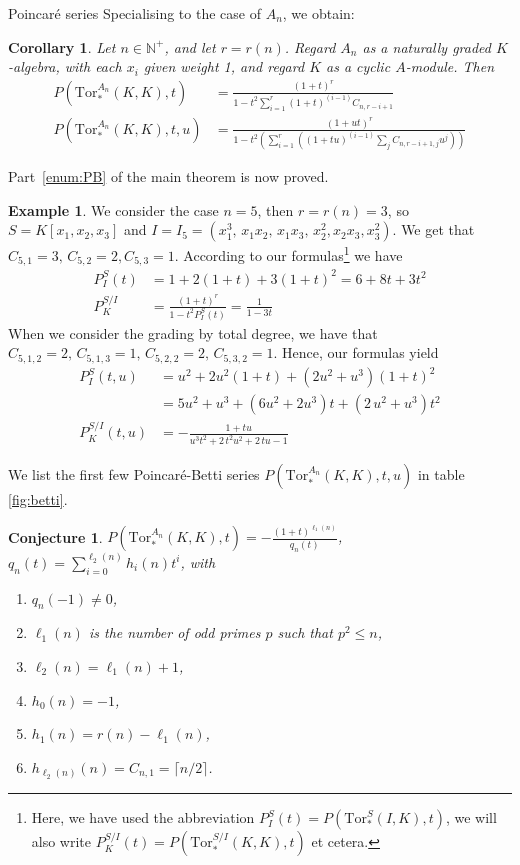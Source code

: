 \documentclass[reqno,10pt]{amsart}
\newcommand{\Tor}{\mathrm{Tor}}
\theoremstyle{definition}
\newtheorem{example}[definition]{Example}
\theoremstyle{remark}
\theoremstyle{plain}
\newtheorem{corr}[definition]{Corollary}
\newtheorem{conjecture}[definition]{Conjecture}
\newcommand{\Nat}{{\mathbb{N}}}
\begin{document}
\begin{section}{Poincar{\'e} series}
Specialising to the case of \(A_n\), we obtain:
\begin{corr}
  \label{corr:pb}
  Let \(n \in \Nat^+\), and let \(r=r(n)\). Regard \(A_n\) as a
  naturally graded \(K\)-algebra, with 
  each \(x_i\) given weight 1, and regard \(K\) as a cyclic \(A\)-module. Then 
  \begin{align}
    P(\Tor_{*}^{A_n}(K,K),t) &= 
    \frac{(1+t)^r}{1- t^2 \sum_{i=1}^r (1+t)^{(i-1)} C_{n,r-i+1} }  \\
    P(\Tor_{*}^{A_n}(K,K),t,u) &= 
    \frac{(1+ut)^r}{1- t^2 \left(\sum_{i=1}^r \left((1+tu)^{(i-1)}
    \sum_j C_{n,r-i+1,j} u^{j}\right)\right)} 
  \end{align}
\end{corr}
Part~\ref{enum:PB}   of the main theorem is now proved.

\begin{example}
  We consider the case \(n=5\), then \(r=r(n)=3\), so
  \(S=K[x_1,x_2,x_3]\) and \(I=I_5 = (x_1^3,\, x_1x_2,\,
  x_1x_3,\, x_2^2, x_2x_3, x_3^2)\). We get that \(C_{5,1}=3,\, C_{5,2}=2,
  C_{5,3}=1\). According to our formulas\footnote{Here, we have used
    the abbreviation  \(P_I^S(t) = P(\Tor_{*}^{S}(I,K),t)\), we will
    also write \(P_K^{S/I}(t) = P(\Tor_{*}^{S/I}(K,K),t)\) et cetera.}
  we  have
  \begin{align*}
  P_I^S(t) &= 1 + 2(1+t) + 3(1+t)^2 =  6  + 8t + 3t^2 \\
  P_K^{S/I} &= \frac{(1+t)^r}{1-t^2 P_I^S(t)} = \frac{1}{1-3t} 
  \end{align*}
  When we consider the grading by total degree, 
  we have that \(C_{5,1,2}=2, \, C_{5,1,3}=1, \, C_{5,2,2} = 2, \,
  C_{5,3,2}=1\). Hence, our formulas yield
  \begin{align*}
    P_I^S(t,u) &= u^2 + 2u^2(1+t) + (2u^2+u^3)(1+t)^2 \\&=
    5{u}^{2}+{u}^{3} + (6{u}^{2}+2{u}^{3})t + \left
      (2\,{u}^{2}+{u}^{3}\right ){t}^{2} \\
    P_K^{S/I}(t,u) &= -{\frac {1+tu}{{u}^{3}{t}^{2}+2\,{t}^{2}{u}^{2}+2\,tu-1}}
  \end{align*}
\end{example}

We list the first few Poincar{\'e}-Betti series
\(P(\Tor_{*}^{A_n}(K,K),t,u)\) in table \ref{fig:betti}.

\begin{conjecture}
\(P(\Tor_{*}^{A_n}(K,K),t) = -\frac{(1+t)^{\ell_1(n)}}{q_n(t)}\), 
\(q_n(t) = \sum_{i=0}^{\ell_2(n)} h_i(n) t^i\), with 
\begin{enumerate}
\item \(q_n(-1) \neq 0\),
\item \(\ell_1(n)\) is the number of odd primes \(p\) such that \(p^2 \le n\), 
\item \(\ell_2(n) = \ell_1(n)+1\),
\item \(h_0(n) = -1\),
\item \(h_1(n) = r(n) - \ell_1(n)\),
\item \(h_{\ell_2(n)}(n) = C_{n,1} = \lceil n/2 \rceil\).
\end{enumerate}
\end{conjecture}



\end{section}
\end{document}
